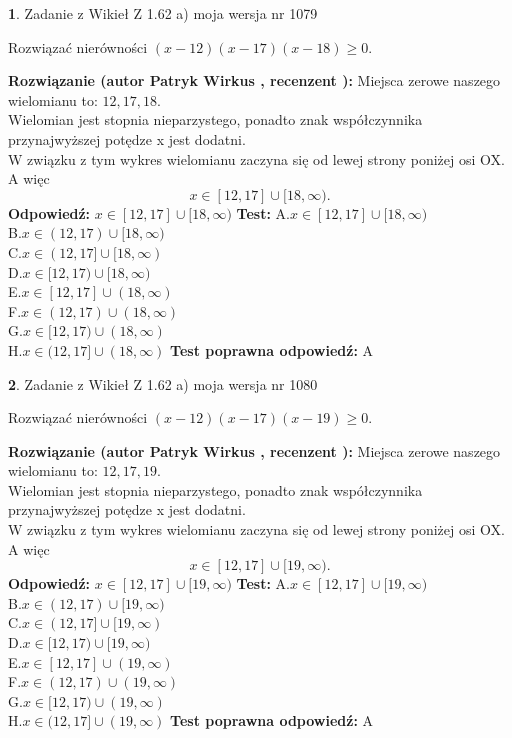 \documentclass[12pt, a4paper]{article}
\theoremstyle{definition} %
\newtheorem{zad}{}
\newcommand{\zadStart}[1]{\begin{zad}#1\newline}
\newcommand{\zadStop}{\end{zad}}
\newcommand{\rozwStart}[2]{\noindent \textbf{Rozwiązanie (autor #1 , recenzent #2): }\newline}
\newcommand{\rozwStop}{\newline}
\newcommand{\odpStart}{\noindent \textbf{Odpowiedź:}\newline}
\newcommand{\odpStop}{\newline}
\newcommand{\testStart}{\noindent \textbf{Test:}\newline}
\newcommand{\testStop}{\newline}
\newcommand{\kluczStart}{\noindent \textbf{Test poprawna odpowiedź:}\newline}
\newcommand{\kluczStop}{\newline}
\begin{document}
\zadStart{Zadanie z Wikieł Z 1.62 a) moja wersja nr 1079}

Rozwiązać nierówności $(x-12)(x-17)(x-18)\ge0$.
\zadStop
\rozwStart{Patryk Wirkus}{}
Miejsca zerowe naszego wielomianu to: $12, 17, 18$.\\
Wielomian jest stopnia nieparzystego, ponadto znak współczynnika przy\linebreak najwyższej potędze x jest dodatni.\\ W związku z tym wykres wielomianu zaczyna się od lewej strony poniżej osi OX. A więc $$x \in [12,17] \cup [18,\infty).$$
\rozwStop
\odpStart
$x \in [12,17] \cup [18,\infty)$
\odpStop
\testStart
A.$x \in [12,17] \cup [18,\infty)$\\
B.$x \in (12,17) \cup [18,\infty)$\\
C.$x \in (12,17] \cup [18,\infty)$\\
D.$x \in [12,17) \cup [18,\infty)$\\
E.$x \in [12,17] \cup (18,\infty)$\\
F.$x \in (12,17) \cup (18,\infty)$\\
G.$x \in [12,17) \cup (18,\infty)$\\
H.$x \in (12,17] \cup (18,\infty)$
\testStop
\kluczStart
A
\kluczStop



\zadStart{Zadanie z Wikieł Z 1.62 a) moja wersja nr 1080}

Rozwiązać nierówności $(x-12)(x-17)(x-19)\ge0$.
\zadStop
\rozwStart{Patryk Wirkus}{}
Miejsca zerowe naszego wielomianu to: $12, 17, 19$.\\
Wielomian jest stopnia nieparzystego, ponadto znak współczynnika przy\linebreak najwyższej potędze x jest dodatni.\\ W związku z tym wykres wielomianu zaczyna się od lewej strony poniżej osi OX. A więc $$x \in [12,17] \cup [19,\infty).$$
\rozwStop
\odpStart
$x \in [12,17] \cup [19,\infty)$
\odpStop
\testStart
A.$x \in [12,17] \cup [19,\infty)$\\
B.$x \in (12,17) \cup [19,\infty)$\\
C.$x \in (12,17] \cup [19,\infty)$\\
D.$x \in [12,17) \cup [19,\infty)$\\
E.$x \in [12,17] \cup (19,\infty)$\\
F.$x \in (12,17) \cup (19,\infty)$\\
G.$x \in [12,17) \cup (19,\infty)$\\
H.$x \in (12,17] \cup (19,\infty)$
\testStop
\kluczStart
A
\kluczStop
\end{document}
